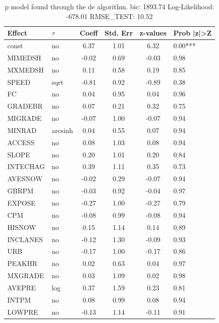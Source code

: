 \begin{table}
	\caption{p model found through the de algorithm. bic: 1893.74 Log-Likelihood: -678.01 RMSE_TEST: 10.52}
	\begin{center}
		\begin{tabular}{|l|l|c|c|c|l|}
			\hline
			Effect & $\tau$ & Coeff & Std. Err & z-values & Prob |z|>Z \\
			\hline
			const & no & 6.37 & 1.01 & 6.32 & 0.00*** \\
			\hline
			MIMEDSH & no & -0.02 & 0.69 & -0.03 & 0.98 \\
			\hline
			MXMEDSH & no & 0.11 & 0.58 & 0.19 & 0.85 \\
			\hline
			SPEED & sqrt & -0.81 & 0.92 & -0.89 & 0.38 \\
			\hline
			FC & no & 0.04 & 0.95 & 0.04 & 0.96 \\
			\hline
			GRADEBR & no & 0.07 & 0.21 & 0.32 & 0.75 \\
			\hline
			MIGRADE & no & -0.07 & 1.00 & -0.07 & 0.94 \\
			\hline
			MINRAD & arcsinh & 0.04 & 0.55 & 0.07 & 0.94 \\
			\hline
			ACCESS & no & 0.08 & 1.03 & 0.08 & 0.94 \\
			\hline
			SLOPE & no & 0.20 & 1.01 & 0.20 & 0.84 \\
			\hline
			INTECHAG & no & 0.39 & 1.11 & 0.35 & 0.73 \\
			\hline
			AVESNOW & no & -0.02 & 0.29 & -0.07 & 0.94 \\
			\hline
			GBRPM & no & -0.03 & 0.92 & -0.04 & 0.97 \\
			\hline
			EXPOSE & no & -0.27 & 1.00 & -0.27 & 0.79 \\
			\hline
			CPM & no & -0.08 & 0.99 & -0.08 & 0.94 \\
			\hline
			HISNOW & no & 0.15 & 1.14 & 0.14 & 0.89 \\
			\hline
			INCLANES & no & -0.12 & 1.30 & -0.09 & 0.93 \\
			\hline
			URB & no & -0.17 & 1.00 & -0.17 & 0.86 \\
			\hline
			PEAKHR & no & 0.02 & 0.63 & 0.04 & 0.97 \\
			\hline
			MXGRADE & no & 0.03 & 1.09 & 0.02 & 0.98 \\
			\hline
			AVEPRE & log & 0.37 & 1.59 & 0.23 & 0.81 \\
			\hline
			INTPM & no & 0.08 & 0.99 & 0.08 & 0.94 \\
			\hline
			LOWPRE & no & -0.13 & 1.14 & -0.11 & 0.91 \\

\end{tabular}
\end{center}
\end{table}
